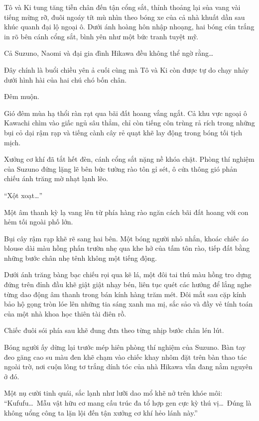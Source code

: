\documentclass[../main.tex]{subfiles}
\begin{document}
Tô và Ki tung tăng tiễn chân đến tận cổng sắt, thỉnh thoảng lại sủa vang vài tiếng mừng rỡ, đuôi ngoáy tít mù nhìn theo bóng xe của cả nhà khuất dần sau khúc quanh đại lộ ngoại ô. Dưới ánh hoàng hôn nhập nhoạng, hai bóng cún trắng in rõ bên cánh cổng sắt, bình yên như một bức tranh tuyệt mỹ.

Cả Suzuno, Naomi và đại gia đình Hikawa đều không thể ngờ rằng\dots

Đây chính là buổi chiều yên ả cuối cùng mà Tô và Ki còn được tự do chạy nhảy dưới hình hài của hai chú chó bốn chân.

\ct

Đêm muộn.

Gió đêm mùa hạ thổi ràn rạt qua bãi đất hoang vắng ngắt. Cả khu vực ngoại ô Kawachi chìm vào giấc ngủ sâu thẳm, chỉ còn tiếng côn trùng rả rích trong những bụi cỏ dại rậm rạp và tiếng cành cây rẻ quạt khẽ lay động trong bóng tối tịch mịch.

Xưởng cơ khí đã tắt hết đèn, cánh cổng sắt nặng nề khóa chặt. Phòng thí nghiệm của Suzuno đứng lặng lẽ bên bức tường rào tôn gỉ sét, ô cửa thông gió phản chiếu ánh trăng mờ nhạt lạnh lẽo.

``Xột xoạt\dots''

Một âm thanh kỳ lạ vang lên từ phía hàng rào ngăn cách bãi đất hoang với con hẻm tối ngoài phố lớn.

Bụi cây rậm rạp khẽ rẽ sang hai bên. Một bóng người nhỏ nhắn, khoác chiếc áo blouse dài màu hồng phấn trườn nhẹ qua khe hở của tấm tôn rào, tiếp đất bằng những bước chân nhẹ tênh không một tiếng động.

Dưới ánh trăng bàng bạc chiếu rọi qua kẽ lá, một đôi tai thú màu hồng tro dựng đứng trên đỉnh đầu khẽ giật giật nhạy bén, liên tục quét các hướng để lắng nghe từng dao động âm thanh trong bán kính hàng trăm mét. Đôi mắt sau cặp kính bảo hộ gọng tròn lóe lên những tia sáng xanh ma mị, sắc sảo và đầy vẻ tính toán của một nhà khoa học thiên tài điên rồ.

Chiếc đuôi sói phía sau khẽ đung đưa theo từng nhịp bước chân lén lút.

Bóng người ấy dừng lại trước mép hiên phòng thí nghiệm của Suzuno. Bàn tay đeo găng cao su màu đen khẽ chạm vào chiếc khay nhôm đặt trên bàn thao tác ngoài trờ, nơi cuộn lông tơ trắng dính tóc của nhà Hikawa vẫn đang nằm nguyên ở đó.

Một nụ cười tinh quái, sắc lạnh như lưỡi dao mổ khẽ nở trên khóe môi: ``Kufufu\dots\ Mẫu vật hữu cơ mang cấu trúc đa tổ hợp gen cực kỳ thú vị\dots\ Đúng là không uổng công ta lặn lội đến tận xưởng cơ khí hẻo lánh này.''
\end{document}
